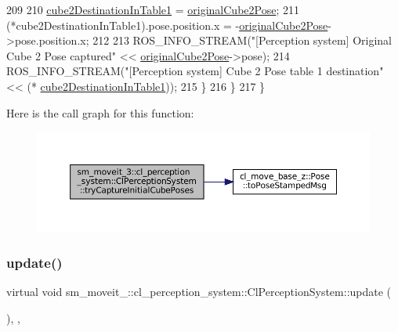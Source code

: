 \begin{DoxyCode}
209 
210         \hyperlink{classsm__moveit__3_1_1cl__perception__system_1_1ClPerceptionSystem_a1aae7fcf13de6c6b6c07dd2b595a5538}{cube2DestinationInTable1} = \hyperlink{classsm__moveit__3_1_1cl__perception__system_1_1ClPerceptionSystem_a71df0282435faa5f108c4fb2d846e90f}{originalCube2Pose};
211         (*cube2DestinationInTable1).pose.position.x = -\hyperlink{classsm__moveit__3_1_1cl__perception__system_1_1ClPerceptionSystem_a71df0282435faa5f108c4fb2d846e90f}{originalCube2Pose}->pose.position.x;
212 
213         ROS\_INFO\_STREAM(\textcolor{stringliteral}{"[Perception system] Original Cube 2 Pose captured"} << 
      \hyperlink{classsm__moveit__3_1_1cl__perception__system_1_1ClPerceptionSystem_a71df0282435faa5f108c4fb2d846e90f}{originalCube2Pose}->pose);
214         ROS\_INFO\_STREAM(\textcolor{stringliteral}{"[Perception system] Cube 2 Pose table 1 destination"} << (*
      \hyperlink{classsm__moveit__3_1_1cl__perception__system_1_1ClPerceptionSystem_a1aae7fcf13de6c6b6c07dd2b595a5538}{cube2DestinationInTable1}));
215       \}
216     \}
217   \}
\end{DoxyCode}
Here is the call graph for this function\+:
\nopagebreak
\begin{figure}[H]
\begin{center}
\leavevmode
\includegraphics[width=350pt]{classsm__moveit__3_1_1cl__perception__system_1_1ClPerceptionSystem_a211e752ccac5163bc775fa426c0d188d_cgraph}
\end{center}
\end{figure}
\mbox{\label{classsm__moveit__3_1_1cl__perception__system_1_1ClPerceptionSystem_a53ce2f7a00275f8c1ce4a0e640bbe3d8}} 
\subsubsection{\texorpdfstring{update()}{update()}}
{\footnotesize\ttfamily virtual void sm\+\_\+moveit\+\_\+::cl\+\_\+perception\+\_\+system\+::\+Cl\+Perception\+System\+::update (\begin{DoxyParamCaption}{ }\end{DoxyParamCaption})\hspace{0.3cm}{\ttfamily [inline]}, {\ttfamily [override]}, {\ttfamily [virtual]}}



